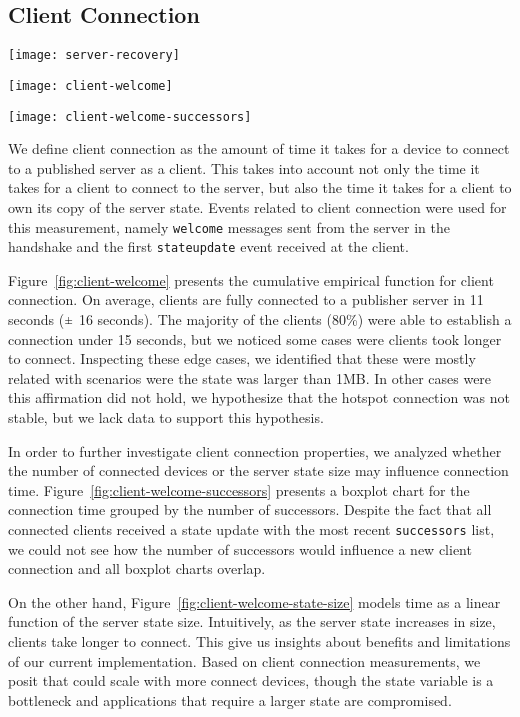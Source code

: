 \subsection{Client Connection}
\label{sub:eval:connection}

\begin{figure*}
        \centering
        \texttt{[image: server-recovery]}
        \caption{Recovery time after a server failure}\label{fig:server-recovery}%
    \endminipage\hfill
        \centering
        \texttt{[image: client-welcome]}
        \caption{Client connection time until receiving a copy of the state}\label{fig:client-welcome}%
    \endminipage\hfill
        \centering
        \texttt{[image: client-welcome-successors]}
        \caption{Client time to connect per number of successors}\label{fig:client-welcome-successors}%
    \endminipage\hfill
\end{figure*}

We define client connection as the amount of time it takes for a device to connect to a published server as a client. 
This takes into account not only the time it takes for a client to connect to the server, but also the time it takes for a client to own its copy of the server state. 
Events related to client connection were used for this measurement, namely \texttt{welcome} messages sent from the server in the handshake and the first \texttt{stateupdate} event received at the client.

Figure~\ref{fig:client-welcome} presents the cumulative empirical function for client connection.
On average, clients are fully connected to a publisher server in 11 seconds ($\rpm$ 16 seconds). 
The majority of the clients (80\%) were able to establish a connection under 15 seconds, 
but we noticed some cases were clients took longer to connect. 
Inspecting these edge cases, we identified that these were mostly related with scenarios were the state was larger than 1MB. 
In other cases were this affirmation did not hold, we hypothesize that the hotspot connection was not stable, but we lack data to support this hypothesis.

In order to further investigate client connection properties, we analyzed whether the number of connected devices or the server state size may influence connection time.
Figure~\ref{fig:client-welcome-successors} presents a boxplot chart for the connection time grouped by the number of successors. 
Despite the fact that all connected clients received a state update with the most recent \texttt{successors} list, 
we could not see how the number of successors would influence a new client connection and all boxplot charts overlap.

On the other hand, Figure~\ref{fig:client-welcome-state-size} models time as a linear function of the server state size.
Intuitively, as the server state increases in size, clients take longer to connect. 
This give us insights about benefits and limitations of our current implementation.
Based on client connection measurements, we posit that \APIshort could scale with more connect devices, though the state variable is a bottleneck and applications that require a larger state are compromised.